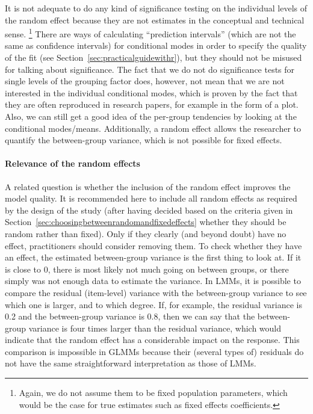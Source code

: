 It is not adequate to do any kind of significance testing on the individual levels of the random effect because they are not estimates in the conceptual and technical sense.%
\footnote{Again, we do not assume them to be fixed population parameters, which would be the case for true estimates such as fixed effects coefficients.}
There are ways of calculating ``prediction intervals'' (which are not the same as confidence intervals) for conditional modes in order to specify the quality of the fit (see Section~\ref{sec:practicalguidewithr}), but they should not be misused for talking about significance.
The fact that we do not do significance tests for single levels of the grouping factor does, however, not mean that we are not interested in the individual conditional modes, which is proven by the fact that they are often reproduced in research papers, for example in the form of a plot.
Also, we can still get a good idea of the per-group tendencies by looking at the conditional modes\slash means.
Additionally, a random effect allows the researcher to quantify the between-group variance, which is not possible for fixed effects.

\paragraph{Relevance of the random effects}

A related question is whether the inclusion of the random effect improves the model quality.
It is recommended here to include all random effects as required by the design of the study (after having decided based on the criteria given in Section~\ref{sec:choosingbetweenrandomandfixedeffects} whether they should be random rather than fixed).
Only if they clearly (and beyond doubt) have no effect, practitioners should consider removing them.
To check whether they have an effect, the estimated between-group variance is the first thing to look at.
If it is close to $0$, there is most likely not much going on between groups, or there simply was not enough data to estimate the variance.
In LMMs, it is possible to compare the residual (item-level) variance with the between-group variance to see which one is larger, and to which degree.
If, for example, the residual variance is 0.2 and the between-group variance is 0.8, then we can say that the between-group variance is four times larger than the residual variance, which would indicate that the random effect has a considerable impact on the response.
This comparison is impossible in GLMMs because their (several types of) residuals do not have the same straightforward interpretation as those of LMMs.

